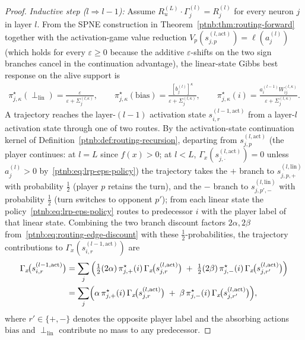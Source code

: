 \begin{proof}
\emph{Inductive step ($l \Rightarrow l-1$):} Assume $R_u^{(L)} \cdot \Gamma^{(l)}_j = R^{(l)}_j$
for every neuron $j$ in layer $l$. From the SPNE construction in Theorem~\ref{ptnb:thm:routing-forward}
together with the activation-game value reduction $V_p(s_{j,p}^{(l,\mathrm{act})}) =
    \ell(a_j^{(l)})$ (which holds for every $\varepsilon \ge 0$ because the additive
$\varepsilon$-shifts on the two sign branches cancel in the continuation advantage), the
linear-state Gibbs best response on the alive support is
\begin{align}\label{ptnb:eq:lrp-eps-policy}
    \pi_{j,\kappa}^\star(\perp_{\mathrm{lin}}) = \frac{\varepsilon}{\varepsilon +
    \Sigma_j^{(l,\kappa)}},
    \qquad
    \pi_{j,\kappa}^\star(\mathrm{bias}) = \frac{[b_j^{(l)}]^\kappa}{\varepsilon +
    \Sigma_j^{(l,\kappa)}},
    \qquad
    \pi_{j,\kappa}^\star(i) = \frac{a_i^{(l-1)} W_{ij}^{(l,\kappa)}}{\varepsilon +
    \Sigma_j^{(l,\kappa)}}.
\end{align}
A trajectory reaches the layer-$(l-1)$ activation state $s_{i,r}^{(l-1, \mathrm{act})}$ from a
layer-$l$ activation state through one of two routes. By the activation-state continuation kernel
of Definition~\ref{ptnb:def:routing-recursion}, departing from $s_{j,p}^{(l, \mathrm{act})}$ (the player
continues: at $l=L$ since $f(x)>0$; at $l<L$, $\Gamma_x(s_{j,\cdot}^{(l,\mathrm{act})})=0$ unless
$a_j^{(l)}>0$ by~\eqref{ptnb:eq:lrp-eps-policy}) the trajectory takes the $+$ branch to $s_{j,p,+}^{(l,
    \mathrm{lin})}$ with probability $\tfrac12$ (player $p$ retains the turn), and the $-$ branch to
$s_{j,p',-}^{(l, \mathrm{lin})}$ with probability $\tfrac12$ (turn switches to opponent $p'$); from
each linear state the policy~\eqref{ptnb:eq:lrp-eps-policy} routes to predecessor $i$ with the player
label of that linear state. Combining the two branch discount factors $2\alpha, 2\beta$
from~\eqref{ptnb:eq:routing-edge-discount} with these $\tfrac12$-probabilities, the trajectory
contributions to $\Gamma_x(s_{i,r}^{(l-1,\mathrm{act})})$ are
\begin{align}
    \Gamma_x\!\bigl(s_{i,r}^{(l-1, \mathrm{act})}\bigr)
    &=
    \sum_j \left(
    \tfrac12 (2\alpha)\, \pi_{j,+}^\star(i)\, \Gamma_x\!\bigl(s_{j,r}^{(l, \mathrm{act})}\bigr)
    \;+\;
    \tfrac12 (2\beta)\, \pi_{j,-}^\star(i)\, \Gamma_x\!\bigl(s_{j,r'}^{(l, \mathrm{act})}\bigr)
    \right) \nonumber \\
    &=
    \sum_j \Bigl(
    \alpha\, \pi_{j,+}^\star(i)\, \Gamma_x\!\bigl(s_{j,r}^{(l, \mathrm{act})}\bigr)
    \;+\;
    \beta\, \pi_{j,-}^\star(i)\, \Gamma_x\!\bigl(s_{j,r'}^{(l, \mathrm{act})}\bigr)
    \Bigr), \label{ptnb:eq:routing-per-state-recursion}
\end{align}
where $r' \in \{+,-\}$ denotes the opposite player label and the absorbing actions $\mathrm{bias}$
and $\perp_{\mathrm{lin}}$ contribute no mass to any predecessor.


\end{proof}
